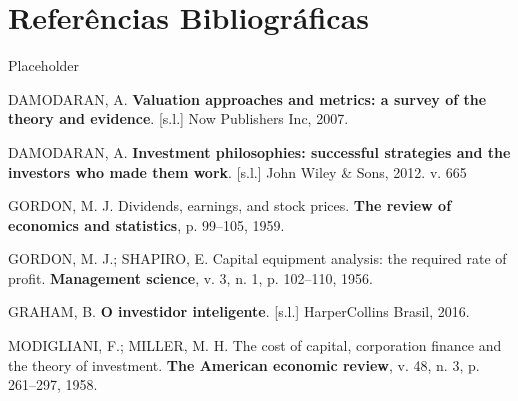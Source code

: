 \documentclass[grad,numbers]{coppe}
\newenvironment{cslreferences}%
  {}%
  {\par}
\begin{document}
  \hypertarget{referuxeancias-bibliogruxe1ficas}{%
  \chapter*{Referências Bibliográficas}\label{referuxeancias-bibliogruxe1ficas}}

  Placeholder

  \hypertarget{refs}{}
  \begin{cslreferences}
  \leavevmode\hypertarget{ref-damodaran2007}{}%
  DAMODARAN, A. \textbf{Valuation approaches and metrics: a survey of the theory and evidence}. {[}s.l.{]} Now Publishers Inc, 2007.

  \leavevmode\hypertarget{ref-damodaran2012}{}%
  DAMODARAN, A. \textbf{Investment philosophies: successful strategies and the investors who made them work}. {[}s.l.{]} John Wiley \& Sons, 2012. v. 665

  \leavevmode\hypertarget{ref-gordon1959}{}%
  GORDON, M. J. Dividends, earnings, and stock prices. \textbf{The review of economics and statistics}, p. 99--105, 1959.

  \leavevmode\hypertarget{ref-gordon1956}{}%
  GORDON, M. J.; SHAPIRO, E. Capital equipment analysis: the required rate of profit. \textbf{Management science}, v. 3, n. 1, p. 102--110, 1956.

  \leavevmode\hypertarget{ref-graham2016}{}%
  GRAHAM, B. \textbf{O investidor inteligente}. {[}s.l.{]} HarperCollins Brasil, 2016.

  \leavevmode\hypertarget{ref-modigliani1958}{}%
  MODIGLIANI, F.; MILLER, M. H. The cost of capital, corporation finance and the theory of investment. \textbf{The American economic review}, v. 48, n. 3, p. 261--297, 1958.
  \end{cslreferences}
  \backmatter
  
  

\end{document}
